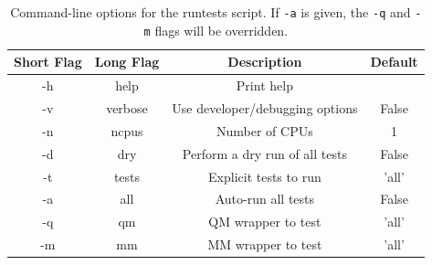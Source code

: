 \documentclass[12pt]{report}
\begin{document}
\begin{table}[hbt]
 \centering
 \begin{tabular}{|c|c|c|c|}
 \hline
 Short Flag & Long Flag   & Description                     & Default\\ \hline
 -h         & \-\-help    & Print help                      & \\
 -v         & \-\-verbose & Use developer/debugging options & False \\
 -n         & \-\-ncpus   & Number of CPUs                  & 1 \\
 -d         & \-\-dry     & Perform a dry run of all tests  & False \\
 -t         & \-\-tests   & Explicit tests to run           & 'all' \\
 -a         & \-\-all     & Auto-run all tests              & False \\
 -q         & \-\-qm      & QM wrapper to test              & 'all' \\
 -m         & \-\-mm      & MM wrapper to test              & 'all' \\
 \hline
 \end{tabular}
 \caption{
 Command-line options for the runtests script. If \texttt{-a} is given, the
 \texttt{-q} and \texttt{-m} flags will be overridden.}
 \label{tab:TestOpts}
\end{table}
\end{document}
